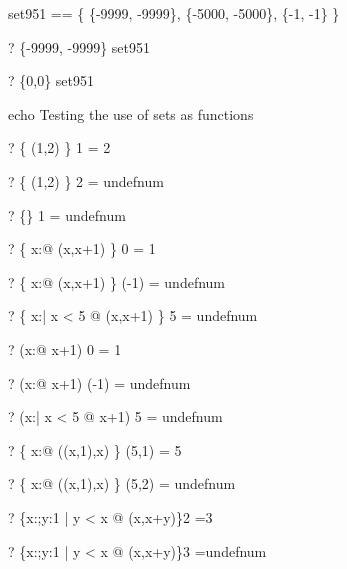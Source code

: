 \begin{zed}
  set951 == \{ \{-9999, -9999\}, \{-5000, -5000\}, \{-1, -1\} \}
\end{zed}
\begin{zed} \vdash?  \{-9999, -9999\} \in set951 \end{zed}
\begin{zed} \vdash?  \{0,0\} \notin set951 \end{zed}


echo     Testing the use of sets as functions
\begin{zed} \vdash?   \{ (1,2) \} 1 = 2 \end{zed}
\begin{zed} \vdash?  \{ (1,2) \} 2 = undefnum \end{zed}
\begin{zed} \vdash?  \{\} 1 = undefnum \end{zed}
\begin{zed} \vdash?   \{ x:\nat @ (x,x+1) \} 0 = 1 \end{zed}
\begin{zed} \vdash?  \{ x:\nat @ (x,x+1) \} (-1) = undefnum \end{zed}
\begin{zed} \vdash?  \{ x:\nat | x < 5 @ (x,x+1) \} 5 = undefnum \end{zed}
\begin{zed} \vdash?   (\lambda x:\nat @ x+1) 0 = 1 \end{zed}
\begin{zed} \vdash?  (\lambda x:\nat @ x+1) (-1) = undefnum \end{zed}
\begin{zed} \vdash?  (\lambda x:\nat | x < 5 @ x+1) 5 = undefnum \end{zed}
\begin{zed} \vdash?   \{ x:\nat @ ((x,1),x) \} (5,1) = 5 \end{zed}
\begin{zed} \vdash?  \{ x:\nat @ ((x,1),x) \} (5,2) = undefnum \end{zed}
\begin{zed}\vdash? \{x:\nat;y:1  | y < x @ (x,x+y)\}2 =3\end{zed}
\begin{zed}\vdash? \{x:\nat;y:1  | y < x @ (x,x+y)\}3 =undefnum\end{zed}
